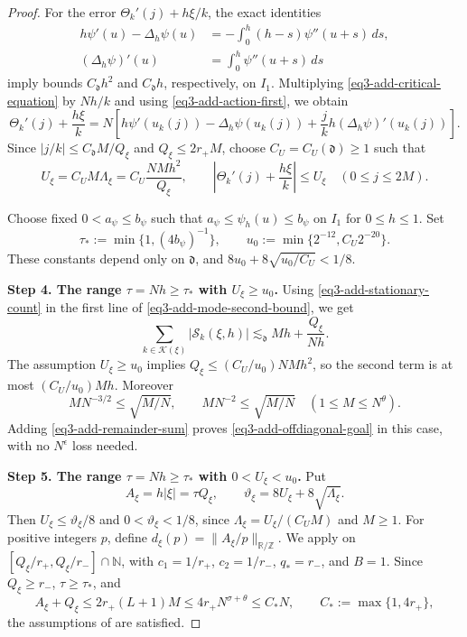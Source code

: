 \documentclass[reqno,12pt]{amsart}
\def \N {\mathbb N}
\def \Z {\mathbb Z}
\def \R {\mathbb R}
\numberwithin{equation}{section}
\begin{document}
\begin{proof}
For the error $\Theta_k'(j)+{h\xi}/{k}$, the exact identities
\begin{align}
 h\psi'(u)-\Delta_h\psi(u)
     &=-\int_0^h(h-s)\psi''(u+s)\,ds,
          \label{eq3-add-divided-identities}\\
 (\Delta_h\psi)'(u)&=\int_0^h\psi''(u+s)\,ds \nonumber
\end{align}
imply bounds $C_{\mathfrak d}h^2$ and $C_{\mathfrak d}h$, respectively,
on $I_1$. Multiplying \eqref{eq3-add-critical-equation} by $Nh/k$
and using \eqref{eq3-add-action-first}, we obtain
\[
 \Theta_k'(j)+\frac{h\xi}{k}
 =N\left[h\psi'(u_k(j))-\Delta_h\psi(u_k(j))
       +\frac jk h(\Delta_h\psi)'(u_k(j))\right].
\]
Since $|j/k|\le C_{\mathfrak d}M/Q_\xi$ and
$Q_\xi\le2r_+M$, choose $C_U=C_U(\mathfrak d)\ge1$ such that
\begin{equation}
 U_\xi=C_U M\Lambda_\xi=C_U\frac{NMh^2}{Q_\xi},\qquad
 \left|\Theta_k'(j)+\frac{h\xi}{k}\right|\le U_\xi
                      \quad(0\le j\le2M).
 \label{eq3-add-derivative-window}
\end{equation}

Choose fixed $0<a_\psi\le b_\psi$ such that
$a_\psi\le\psi_h(u)\le b_\psi$ on $I_1$ for $0\le h\le1$.
Set
\[
 \tau_*:=\min\{1,(4b_\psi)^{-1}\},\qquad
 u_0:=\min\{2^{-12},C_U2^{-20}\}.
\]
These constants depend only on $\mathfrak d$, and
$8u_0+8\sqrt{u_0/C_U}<1/8$.

\medskip
\noindent\textbf{Step 4. The range $\tau=Nh\ge\tau_*$ with $U_\xi\ge u_0$.}
Using \eqref{eq3-add-stationary-count} in the first line of
\eqref{eq3-add-mode-second-bound}, we get
\[
 \sum_{k\in\mathcal K(\xi)}|\mathcal S_k(\xi,h)|
 \lesssim_{\mathfrak d}Mh+\frac{Q_\xi}{Nh}.
\]
The assumption $U_\xi\ge u_0$ implies
$Q_\xi\le(C_U/u_0)NMh^2$, so the second term is at most
$(C_U/u_0)Mh$. Moreover
\[
 MN^{-3/2}\le\sqrt{M/N},\qquad MN^{-2}\le\sqrt{M/N}
                                  \quad(1\le M\le N^{\theta}).
\]
Adding \eqref{eq3-add-remainder-sum} proves
\eqref{eq3-add-offdiagonal-goal} in this case, with no $N^\epsilon$
loss needed.

\medskip
\noindent\textbf{Step 5. The range $\tau=Nh\ge\tau_*$ with $0<U_\xi<u_0$.}
Put
\[
 A_\xi=h|\xi|=\tau Q_\xi,\qquad
 \vartheta_\xi=8U_\xi+8\sqrt{\Lambda_\xi}.
\]
Then $U_\xi\le\vartheta_\xi/8$ and
$0<\vartheta_\xi<1/8$, since
$\Lambda_\xi=U_\xi/(C_UM)$ and $M\ge1$.
For positive integers $p$, define
$d_\xi(p)=\|A_\xi/p\|_{\R/\Z}$.
We apply  on
$[Q_\xi/r_+,Q_\xi/r_-]\cap\N$, with
$c_1=1/r_+$, $c_2=1/r_-$, $q_*=r_-$, and $B=1$.
Since $Q_\xi\ge r_-$, $\tau\ge\tau_*$, and
\begin{equation}
 A_\xi+Q_\xi\le2r_+(L+1)M
       \le4r_+N^{\sigma+\theta}\le C_*N,
 \qquad C_*:=\max\{1,4r_+\},
 \label{eq3-add-resonance-size}
\end{equation}
the assumptions of  are satisfied.


\end{proof}
\end{document}
